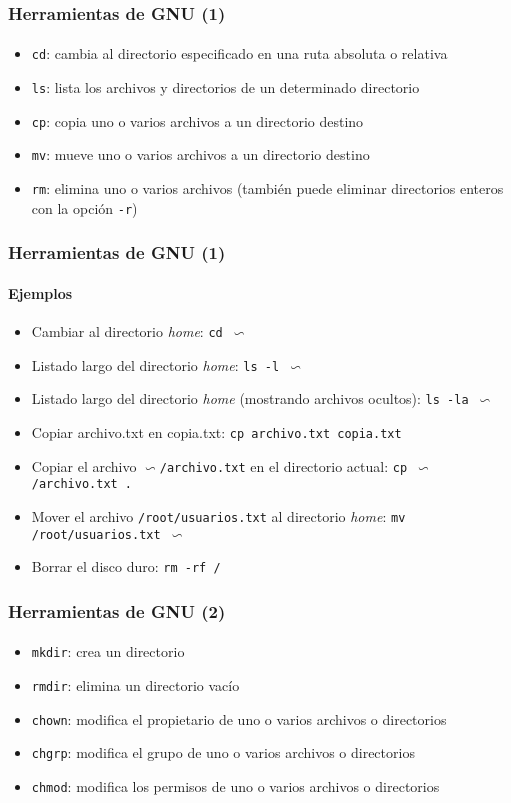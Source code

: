 \documentclass[12pt]{beamer}
\begin{document}
\begin{frame}
  \frametitle{Herramientas de GNU (1)}
  \framesubtitle{}
  \begin{itemize}
    \item \texttt{cd}: cambia al directorio especificado en una ruta absoluta o relativa
    \medskip
    \item \texttt{ls}: lista los archivos y directorios de un determinado directorio
    \medskip
    \item \texttt{cp}: copia uno o varios archivos a un directorio destino
    \medskip
    \item \texttt{mv}: mueve uno o varios archivos a un directorio destino
    \medskip
    \item \texttt{rm}: elimina uno o varios archivos (también puede eliminar directorios enteros con la opción \texttt{-r})
  \end{itemize}
\end{frame}

\begin{frame}
  \frametitle{Herramientas de GNU (1)}
  \framesubtitle{Ejemplos}
  \begin{itemize}
    \item Cambiar al directorio \textit{home}: \texttt{cd $\backsim$}
    \medskip
    \item Listado largo del directorio \textit{home}: \texttt{ls -l $\backsim$}
    \medskip
    \item Listado largo del directorio \textit{home} (mostrando archivos ocultos): \texttt{ls -la $\backsim$}
    \medskip
    \item Copiar archivo.txt en copia.txt: \texttt{cp archivo.txt copia.txt}
    \medskip
    \item Copiar el archivo \texttt{$\backsim$/archivo.txt} en el directorio actual: \texttt{cp $\backsim$/archivo.txt .}
    \medskip
    \item Mover el archivo \texttt{/root/usuarios.txt} al directorio \textit{home}: \texttt{mv /root/usuarios.txt $\backsim$}
    \medskip
    \item Borrar el disco duro: \texttt{rm -rf /}
  \end{itemize}
\end{frame}


\begin{frame}
  \frametitle{Herramientas de GNU (2)}
  \framesubtitle{}
  \begin{itemize}
    \item \texttt{mkdir}: crea un directorio
    \medskip
    \item \texttt{rmdir}: elimina un directorio vacío
    \medskip
    \item \texttt{chown}: modifica el propietario de uno o varios archivos o directorios
    \medskip
    \item \texttt{chgrp}: modifica el grupo de uno o varios archivos o directorios
    \medskip
    \item \texttt{chmod}: modifica los permisos de uno o varios archivos o directorios
  \end{itemize}
\end{frame}
\end{document}
